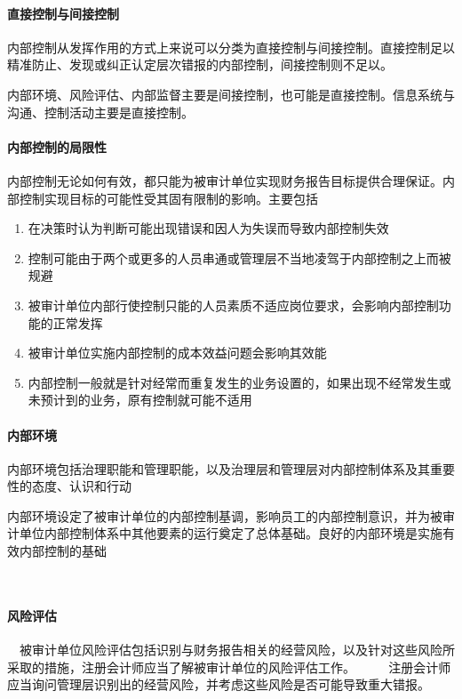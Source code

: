 \documentclass[UTF8,12pt]{ctexart}
\numberwithin{equation}{section} %
\numberwithin{figure}{section}
\numberwithin{table}{section}
\begin{document}
	\paragraph{直接控制与间接控制}内部控制从发挥作用的方式上来说可以分类为直接控制与间接控制。直接控制足以精准防止、发现或纠正认定层次错报的内部控制，间接控制则不足以。
	
	内部环境、风险评估、内部监督主要是间接控制，也可能是直接控制。信息系统与沟通、控制活动主要是直接控制。
	
	\paragraph{内部控制的局限性} 内部控制无论如何有效，都只能为被审计单位实现财务报告目标提供合理保证。内部控制实现目标的可能性受其固有限制的影响。主要包括
	\begin{enumerate}
		\item 在决策时认为判断可能出现错误和因人为失误而导致内部控制失效
		
		\item 控制可能由于两个或更多的人员串通或管理层不当地凌驾于内部控制之上而被规避
		
		\item 被审计单位内部行使控制只能的人员素质不适应岗位要求，会影响内部控制功能的正常发挥
		
		\item 被审计单位实施内部控制的成本效益问题会影响其效能
		
		\item 内部控制一般就是针对经常而重复发生的业务设置的，如果出现不经常发生或未预计到的业务，原有控制就可能不适用
	\end{enumerate}
	
	\paragraph{内部环境}
	内部环境包括治理职能和管理职能，以及治理层和管理层对内部控制体系及其重要性的态度、认识和行动
	
	内部环境设定了被审计单位的内部控制基调，影响员工的内部控制意识，并为被审计单位内部控制体系中其他要素的运行奠定了总体基础。良好的内部环境是实施有效内部控制的基础
	
	　\paragraph{风险评估}
	　被审计单位风险评估包括识别与财务报告相关的经营风险，以及针对这些风险所采取的措施，注册会计师应当了解被审计单位的风险评估工作。
	　
	　注册会计师应当询问管理层识别出的经营风险，并考虑这些风险是否可能导致重大错报。
	
\end{document}
